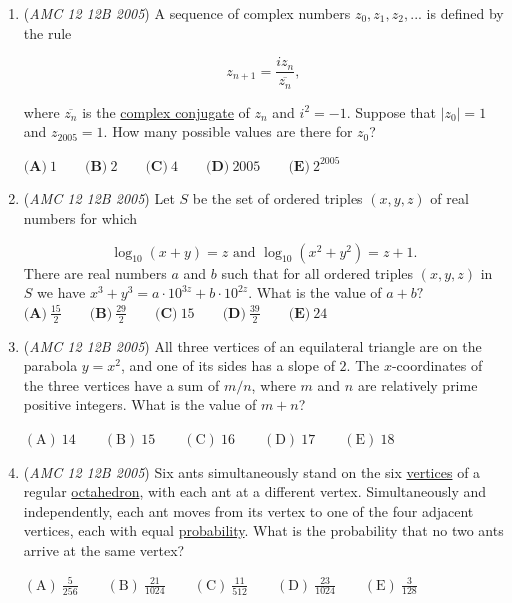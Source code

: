 \begin{enumerate}
 $\mathrm{(A)}\ {{{0}}} \qquad \mathrm{(B)}\ {{{1}}} \qquad \mathrm{(C)}\ {{{2}}} \qquad \mathrm{(D)}\ {{{3}}} \qquad \mathrm{(E)}\ {{{4}}}$


	\item (\textit{AMC 12 12B 2005}) A sequence of complex numbers $z_{0}, z_{1}, z_{2}, ...$ is defined by the rule


 
 \[z_{n+1} = \frac {iz_{n}}{\overline {z_{n}}},\]


 where $\overline {z_{n}}$ is the \href{https://artofproblemsolving.com/wiki/index.php?title=Complex\_conjugate}{complex conjugate} of $z_{n}$ and $i^{2}=-1$. Suppose that $|z_{0}|=1$ and $z_{2005}=1$. How many possible values are there for $z_{0}$?


 $\textbf{(A)}\ 1 \qquad  \textbf{(B)}\ 2 \qquad  \textbf{(C)}\ 4 \qquad  \textbf{(D)}\ 2005 \qquad  \textbf{(E)}\ 2^{2005}$


	\item (\textit{AMC 12 12B 2005}) Let $S$ be the set of ordered triples $(x,y,z)$ of real numbers for which


 
 \[\log_{10}(x+y) = z \text{ and } \log_{10}(x^{2}+y^{2}) = z+1.\]
There are real numbers $a$ and $b$ such that for all ordered triples $(x,y,z)$ in $S$ we have $x^{3}+y^{3}=a \cdot 10^{3z} + b \cdot 10^{2z}.$ What is the value of $a+b?$
$\textbf{(A)}\ \frac {15}{2} \qquad  \textbf{(B)}\ \frac {29}{2} \qquad  \textbf{(C)}\ 15 \qquad  \textbf{(D)}\ \frac {39}{2} \qquad  \textbf{(E)}\ 24$


	\item (\textit{AMC 12 12B 2005}) All three vertices of an equilateral triangle are on the parabola $y=x^2$, and one of its sides has a slope of $2$.  The $x$-coordinates of the three vertices have a sum of $m/n$, where $m$ and $n$ are relatively prime positive integers.  What is the value of $m+n$?


 $\mathrm{(A)}\ {{{14}}} \qquad \mathrm{(B)}\ {{{15}}} \qquad \mathrm{(C)}\ {{{16}}} \qquad \mathrm{(D)}\ {{{17}}} \qquad \mathrm{(E)}\ {{{18}}}$


	\item (\textit{AMC 12 12B 2005}) Six ants simultaneously stand on the six \href{https://artofproblemsolving.com/wiki/index.php?title=Vertex}{vertices} of a regular \href{https://artofproblemsolving.com/wiki/index.php?title=Octahedron}{octahedron}, with each ant at a different vertex. Simultaneously and independently, each ant moves from its vertex to one of the four adjacent vertices, each with equal \href{https://artofproblemsolving.com/wiki/index.php?title=Probability}{probability}. What is the probability that no two ants arrive at the same vertex?


 $\mathrm{(A)}\ \frac {5}{256} \qquad\mathrm{(B)}\ \frac {21}{1024} \qquad\mathrm{(C)}\ \frac {11}{512} \qquad\mathrm{(D)}\ \frac {23}{1024} \qquad\mathrm{(E)}\ \frac {3}{128}$


\end{enumerate}